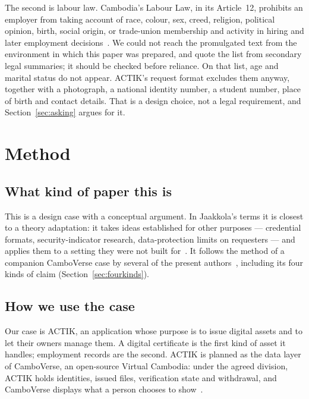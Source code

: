 \documentclass[10pt,a4paper,twocolumn]{article}
\begin{document}
The second is labour law. Cambodia's Labour Law, in its Article~12, prohibits an
employer from taking account of race, colour, sex, creed, religion, political
opinion, birth, social origin, or trade-union membership and activity in hiring
and later employment decisions~\citep{khlabourlaw}. We could not reach the
promulgated text from the environment in which this paper was prepared, and
quote the list from secondary legal summaries; it should be checked before
reliance. On that list, age and marital status do not appear. ACTIK's request
format excludes them anyway, together with a photograph, a national identity
number, a student number, place of birth and contact details. That is a design
choice, not a legal requirement, and Section~\ref{sec:asking} argues for it.

\section{Method}
\label{sec:method}

\subsection{What kind of paper this is}

This is a design case with a conceptual argument. In Jaakkola's terms it is
closest to a theory adaptation: it takes ideas established for other purposes ---
credential formats, security-indicator research, data-protection limits on
requesters --- and applies them to a setting they were not built
for~\citep{jaakkola2020}. It follows the method of a companion CamboVerse case by
several of the present authors~\citep{chay2026precinct}, including its four kinds
of claim (Section~\ref{sec:fourkinds}).

\subsection{How we use the case}

Our case is ACTIK, an application whose purpose is to issue digital assets and to
let their owners manage them. A digital certificate is the first kind of asset it
handles; employment records are the second. ACTIK is planned as the data layer of
CamboVerse, an open-source Virtual Cambodia: under the agreed division, ACTIK holds
identities, issued files, verification state and withdrawal, and CamboVerse
displays what a person chooses to show~\citep{chay2026precinct}.
\end{document}
